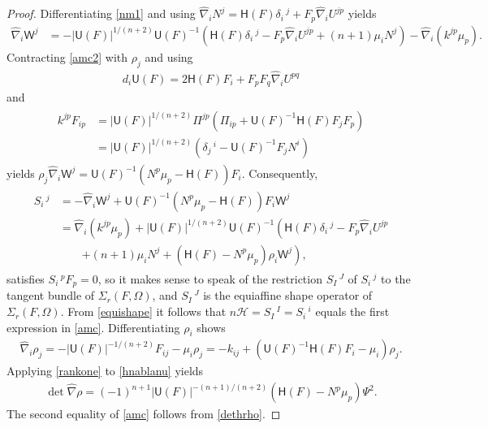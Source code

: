 \documentclass [leqno, 10pt]{amsart}
\theoremstyle{definition}
\numberwithin{equation}{section}
\newcommand{\muf}{\mu}
\newcommand{\amc}{\mathcal{H}}
\newcommand{\Om}{\Omega}
\newcommand{\U}{\mathsf{U}}
\newcommand{\lc}{\Sigma}
\renewcommand{\H}{\mathsf{H}}
\newcommand{\sff}{\Pi}
\newcommand{\nm}{\mathsf{W}}
\newcommand{\hnabla}{\widehat{\nabla}}
\begin{document}
\begin{proof}
Differentiating \eqref{nm1} and using $\hnabla_{i}N^{j} = \H(F)\delta_{i}\,^{j} + F_{p}\hnabla_{i}U^{jp}$ yields
\begin{align}\label{amc2}
\hnabla_{i}\nm^{j} & = -|\U(F)|^{1/(n+2)}\U(F)^{-1}\left(\H(F)\delta_{i}\,^{j} - F_{p}\hnabla_{i}U^{jp} + (n+1)\muf_{i}N^{j} \right) - \hnabla_{i}(k^{jp}\muf_{p}).
\end{align}
Contracting \eqref{amc2} with $\rho_{j}$ and using 
\begin{align}\label{duf}
d_{i}\U(F) = 2\H(F)F_{i} + F_{p}F_{q}\hnabla_{i}U^{pq}
\end{align}
and
\begin{align}
\begin{split}
k^{jp}F_{ip} &= |\U(F)|^{1/(n+2)} \sff^{jp}(\sff_{ip} + \U(F)^{-1}\H(F)F_{j}F_{p}) \\
&= |\U(F)|^{1/(n+2)}(\delta_{j}\,^{i} - \U(F)^{-1}F_{j}N^{i})
\end{split}
\end{align}
yields $\rho_{j}\hnabla_{i}\nm^{j} = \U(F)^{-1}(N^{p}\muf_{p} - \H(F))F_{i}$. Consequently,
\begin{align}\label{equishape}
\begin{split}
S_{i}\,^{j} & = -\hnabla_{i}\nm^{j} + \U(F)^{-1}(N^{p}\muf_{p} - \H(F))F_{i}\nm^{j} \\
& = \hnabla_{i}(k^{jp}\muf_{p})  + |\U(F)|^{1/(n+2)}\U(F)^{-1}\left(\H(F)\delta_{i}\,^{j} - F_{p}\hnabla_{i}U^{jp}\right.\\&\qquad \left. + (n+1)\muf_{i}N^{j}  + (\H(F) - N^{p}\muf_{p})\rho_{i}\nm^{j}\right),
\end{split}
\end{align}
satisfies $S_{i}\,^{p}F_{p} = 0$, so it makes sense to speak of the restriction $S_{I}\,^{J}$ of $S_{i}\,^{j}$ to the tangent bundle of $\lc_{r}(F, \Om)$, and $S_{I}\,^{J}$ is the equiaffine shape operator of $\lc_{r}(F, \Om)$. From \eqref{equishape} it follows that $n\amc = S_{I}\,^{I} = S_{i}\,^{i}$ equals the first expression in \eqref{amc}.  Differentiating $\rho_{i}$ shows
\begin{align}\label{hnablanu}
\hnabla_{i}\rho_{j} = -|\U(F)|^{-1/(n+2)}F_{ij} - \muf_{i}\rho_{j} = -k_{ij} + (\U(F)^{-1}\H(F)F_{i} - \muf_{i})\rho_{j}.
\end{align}
Applying \eqref{rankone} to \eqref{hnablanu} yields
\begin{align}\label{dethrho}
\det \hnabla \rho = (-1)^{n+1}|\U(F)|^{-(n+1)/(n+2)}(\H(F) - N^{p}\muf_{p})\Psi^{2}.
\end{align}
The second equality of \eqref{amc} follows from \eqref{dethrho}.
\end{proof}
\end{document}
